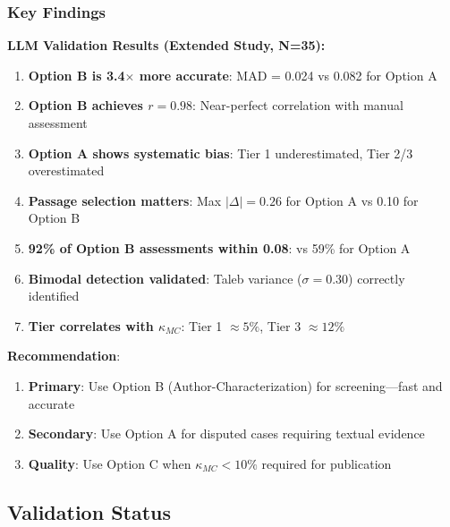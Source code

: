 \documentclass[11pt,a4paper]{article}
\begin{document}
\subsubsection{Key Findings}

\begin{resultbox}
\textbf{LLM Validation Results (Extended Study, N=35):}

\begin{enumerate}
    \item \textbf{Option B is 3.4$\times$ more accurate}: MAD = 0.024 vs 0.082 for Option A
    \item \textbf{Option B achieves $r = 0.98$}: Near-perfect correlation with manual assessment
    \item \textbf{Option A shows systematic bias}: Tier 1 underestimated, Tier 2/3 overestimated
    \item \textbf{Passage selection matters}: Max $|\Delta| = 0.26$ for Option A vs 0.10 for Option B
    \item \textbf{92\% of Option B assessments within 0.08}: vs 59\% for Option A
    \item \textbf{Bimodal detection validated}: Taleb variance ($\sigma = 0.30$) correctly identified
    \item \textbf{Tier correlates with $\kappa_{MC}$}: Tier 1 $\approx 5\%$, Tier 3 $\approx 12\%$
\end{enumerate}
\end{resultbox}

\textbf{Recommendation}:
\begin{enumerate}
    \item \textbf{Primary}: Use Option B (Author-Characterization) for screening---fast and accurate
    \item \textbf{Secondary}: Use Option A for disputed cases requiring textual evidence
    \item \textbf{Quality}: Use Option C when $\kappa_{MC} < 10\%$ required for publication
\end{enumerate}

\subsection{Validation Status}
\end{document}
